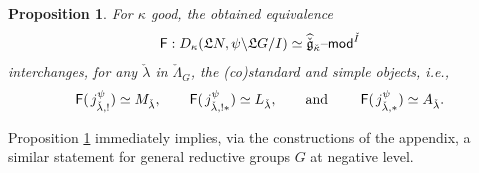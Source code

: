 \documentclass[11pt,reqno]{amsart}
\newcommand{\cgk}{\widehat{\check{\mathfrak{g}}}_{\check{\kappa}}}
\newcommand{\fL}{\mathfrak{L}}
\newtheorem{pro}[subsubsection]{Proposition}
\theoremstyle{remark}
\numberwithin{equation}{section}
\renewcommand{\mod}{\text{\textendash}\mathsf{mod}}
\begin{document}
\begin{pro}\label{p:whogoeswhere} For $\kappa$ good, the obtained 
	equivalence
	\[ \mathsf{F}: D_\kappa( \fL N, \psi \backslash \fL G / 
	I) \simeq 
	\cgk\mod^{\check{I}}
	\]
	interchanges, for any $\check{\lambda}$ in $\check{\Lambda}_G$, the 
	(co)standard and simple objects, i.e.,
	\[
	\mathsf{F}( \hspace{.5mm}j_{\check{\lambda}, !}^\psi\hspace{.1mm} )\simeq 
	M_{\check{\lambda}}, \quad 
	\quad 
	\mathsf{F}(\hspace{.5mm} j_{\check{\lambda}, !*}^\psi \hspace{.1mm})\simeq 
	L_{\check{\lambda}}, \quad 
	\quad \text{and } \quad \quad 
	\mathsf{F}(\hspace{.5mm}j_{\check{\lambda}, *}^\psi\hspace{.1mm}) \simeq 
	A_{\check{\lambda}}. 
	\]
\end{pro}
Proposition \ref{p:whogoeswhere} immediately 
implies, via the constructions of the appendix, a similar statement for 
general reductive groups $G$ at negative level. 
 
\end{document}
